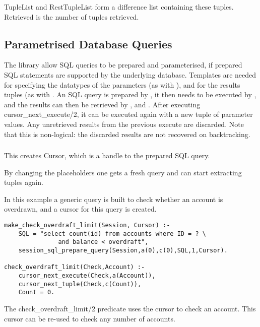 TupleList and RestTupleList form a difference list containing these
tuples. Retrieved is the number of tuples retrieved.


\subsection{Parametrised Database Queries}

\begin{sloppypar}
The library allow SQL queries to be prepared and parameterised, if prepared
SQL statements are supported by the underlying database. Templates are needed
for specifying the datatypes of the parameters (as with
),
and for the results tuples (as with . An SQL query
is prepared by
,
it then needs to be executed by
,
and the results can then be retrieved by ,
 and
. After
executing cursor_next_execute/2, it can be executed again with a new tuple
of parameter values. Any unretrieved results from the previous execute are
discarded. Note that this is non-logical: the discarded results are not
recovered on backtracking.
\end{sloppypar}

\subsubsection
{}
\label{session-prepare-sql-query/5}

This creates Cursor, which is a handle to the prepared SQL query.

By changing the placeholders one gets a fresh query and can start extracting
tuples again.


In this example a generic query is built to check whether an account is
overdrawn, and a cursor for this query is created.
\begin{verbatim}
make_check_overdraft_limit(Session, Cursor) :-
    SQL = "select count(id) from accounts where ID = ? \
               and balance < overdraft",
    session_sql_prepare_query(Session,a(0),c(0),SQL,1,Cursor).

check_overdraft_limit(Check,Account) :-
    cursor_next_execute(Check,a(Account)),
    cursor_next_tuple(Check,c(Count)),
    Count = 0.
\end{verbatim}
The check_overdraft_limit/2 predicate uses the cursor to check an account.
This cursor can be re-used to check any number of accounts.



